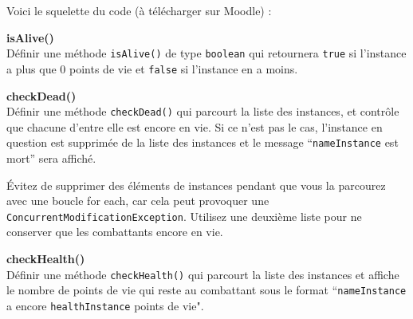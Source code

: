 Voici le squelette du code (à télécharger sur Moodle) :

\begin{Exercice}[5 minutes] \textbf{isAlive()}\\
    Définir une méthode \lstinline{isAlive()} de type \lstinline{boolean} qui retournera \lstinline{true} si l'instance a plus que 0 points de vie et \lstinline{false} si l'instance en a moins.
\begin{solution}
	
\end{solution}
\end{Exercice}
\begin{Exercice}[10 minutes] \textbf{checkDead()}\\
    Définir une méthode \lstinline{checkDead()} qui parcourt la liste des instances, et contrôle que chacune d'entre elle est encore en vie. Si ce n'est pas le cas, l'instance en question est supprimée de la liste des instances et le message ``\lstinline{nameInstance} est mort'' sera affiché.
    
\begin{conseil}
Évitez de supprimer des éléments de instances pendant que vous la parcourez avec une boucle for each, car cela peut provoquer une \lstinline{ConcurrentModificationException}. Utilisez une deuxième liste pour ne conserver que les combattants encore en vie.
\end{conseil}
\begin{solution}
	
\end{solution}
\end{Exercice}
\begin{Exercice}[5 minutes] \textbf{checkHealth()}\\
    Définir une méthode \lstinline{checkHealth()} qui parcourt la liste des instances et affiche le nombre de points de vie qui reste au combattant sous le format ``\lstinline{nameInstance} a encore \lstinline{healthInstance} points de vie".
\begin{solution}
	
\end{solution}
\end{Exercice}
